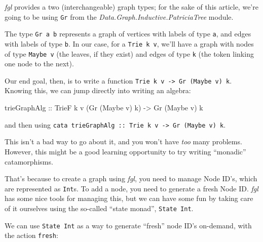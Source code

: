 \documentclass[]{article}
\newenvironment{Shaded}{}{}
\newcommand{\CommentTok}[1]{\textcolor[rgb]{0.38,0.63,0.69}{\textit{#1}}}
\newcommand{\DataTypeTok}[1]{\textcolor[rgb]{0.56,0.13,0.00}{#1}}
\newcommand{\DecValTok}[1]{\textcolor[rgb]{0.25,0.63,0.44}{#1}}
\newcommand{\FunctionTok}[1]{\textcolor[rgb]{0.02,0.16,0.49}{#1}}
\newcommand{\NormalTok}[1]{#1}
\newcommand{\OtherTok}[1]{\textcolor[rgb]{0.00,0.44,0.13}{#1}}
\begin{document}
\emph{fgl} provides a two (interchangeable) graph types; for the sake of this
article, we're going to be using \texttt{Gr} from the
\emph{Data.Graph.Inductive.PatriciaTree} module.

The type \texttt{Gr\ a\ b} represents a graph of vertices with labels of type
\texttt{a}, and edges with labels of type \texttt{b}. In our case, for a
\texttt{Trie\ k\ v}, we'll have a graph with nodes of type \texttt{Maybe\ v}
(the leaves, if they exist) and edges of type \texttt{k} (the token linking one
node to the next).

Our end goal, then, is to write a function
\texttt{Trie\ k\ v\ -\textgreater{}\ Gr\ (Maybe\ v)\ k}. Knowing this, we can
jump directly into writing an algebra:

\begin{Shaded}
\begin{Highlighting}[]
\NormalTok{trieGraphAlg}
\OtherTok{    ::} \DataTypeTok{TrieF}\NormalTok{ k v (}\DataTypeTok{Gr}\NormalTok{ (}\DataTypeTok{Maybe}\NormalTok{ v) k)}
    \OtherTok{->} \DataTypeTok{Gr}\NormalTok{ (}\DataTypeTok{Maybe}\NormalTok{ v) k}
\end{Highlighting}
\end{Shaded}

and then using
\texttt{cata\ trieGraphAlg\ ::\ Trie\ k\ v\ -\textgreater{}\ Gr\ (Maybe\ v)\ k}.

This isn't a bad way to go about it, and you won't have \emph{too} many
problems. However, this might be a good learning opportunity to try writing
``monadic'' catamorphisms.

That's because to create a graph using \emph{fgl}, you need to manage Node ID's,
which are represented as \texttt{Int}s. To add a node, you need to generate a
fresh Node ID. \emph{fgl} has some nice tools for managing this, but we can have
some fun by taking care of it ourselves using the so-called ``state monad'',
\texttt{State\ Int}.

We can use \texttt{State\ Int} as a way to generate ``fresh'' node ID's
on-demand, with the action \texttt{fresh}:

\begin{Shaded}
\end{Shaded}
\end{document}
